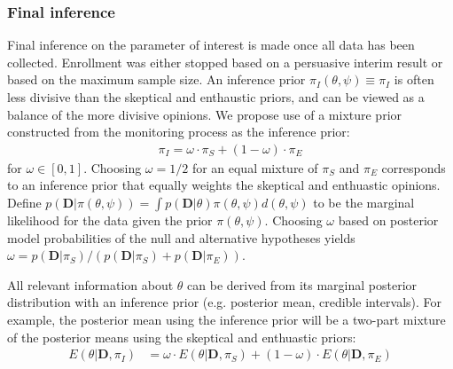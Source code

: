 \documentclass[12pt]{article}
\begin{document}
\subsubsection{Final inference}
Final inference on the parameter of interest is made once all data has been collected. Enrollment was either stopped based on a persuasive interim result or based on the maximum sample size. An inference prior $\pi_{I}(\theta,\psi)\equiv\pi_{I}$ is often less divisive than the skeptical and enthaustic priors, and can be viewed as a balance of the more divisive opinions. We propose use of a mixture prior constructed from the monitoring process as the inference prior:
\begin{align*}
\pi_{I}=\omega\cdot\pi_{S}+(1-\omega)\cdot\pi_E
\end{align*}
for $\omega\in[0,1]$. Choosing $\omega=1/2$ for an equal mixture of $\pi_S$ and $\pi_E$ corresponds to an inference prior that equally weights the skeptical and enthuastic opinions. Define $p(\mathbf{D}|\pi(\theta,\psi))=\int p(\mathbf{D}|\theta)\pi(\theta,\psi)d(\theta,\psi)$ to be the marginal likelihood for the data given the prior $\pi(\theta,\psi)$. Choosing $\omega$ based on posterior model probabilities of the null and alternative hypotheses yields $\omega=p(\mathbf{D}| \pi_{S})/(p(\mathbf{D}| \pi_{S})+p(\mathbf{D}| \pi_{E}))$. 


All relevant information about $\theta$ can be derived from its marginal posterior distribution with an inference prior (e.g. posterior mean, credible intervals). For example, the posterior mean using the inference prior will be a two-part mixture of the posterior means using the skeptical and enthuastic priors:
\begin{align*}
E(\theta|\mathbf{D},\pi_I)&=\omega\cdot E(\theta|\mathbf{D}, \pi_{S})+(1-\omega)\cdot E(\theta|\mathbf{D}, \pi_{E})%
\end{align*}
\end{document}
